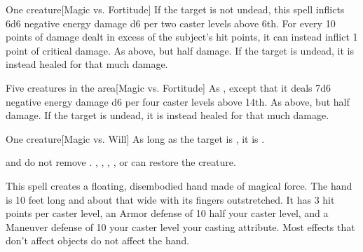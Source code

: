 \spellrng{\rngclose}
\begin{spelltarget}{One creature}[Magic vs. Fortitude]
    \spellsuccess If the target is not undead, this spell inflicts 6d6 negative energy damage \add d6 per two caster levels above 6th. For every 10 points of damage dealt in excess of the subject's hit points, it can instead inflict 1 point of critical damage.
    \spellfailure As above, but half damage.
    \spelleffect If the target is undead, it is instead healed for that much damage.
\end{spelltarget}

\begin{spelltargets}{Five creatures in the area}[Magic vs. Fortitude]
    \spellsuccess As , except that it deals 7d6 negative energy damage \add d6 per four caster levels above 14th.
    \spellfailure As above, but half damage.
    \spelleffect If the target is undead, it is instead healed for that much damage.
\end{spelltargets}

\spellrng{\rngclose}
\begin{spelltarget}{One creature}[Magic vs. Will]
    \spellsuccess As long as the target is \bloodied, it is \confused.
\end{spelltarget}
\spellnotes {} and  do not remove . , , , , or  can restore the creature.

\spellrng{\rngmed}
\spelldur{\durshort \dismissable}
\spellline
\spelleffect This spell creates a floating, disembodied hand made of magical force. The hand is 10 feet long and about that wide with its fingers outstretched. It has 3 hit points per caster level, an Armor defense of 10 \add half your caster level, and a Maneuver defense of 10 \add your caster level \add your casting attribute. Most effects that don't affect objects do not affect the hand.

